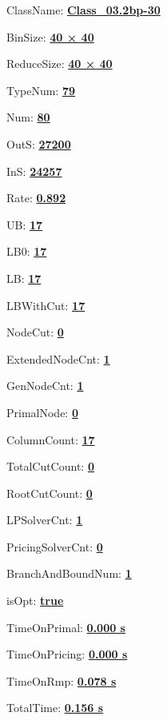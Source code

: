 \documentclass[11pt]{article}
\begin{document}
\pagestyle{empty}


ClassName: \underline{\textbf{Class_03.2bp-30}}
\par
BinSize: \underline{\textbf{40 × 40}}
\par
ReduceSize: \underline{\textbf{40 × 40}}
\par
TypeNum: \underline{\textbf{79}}
\par
Num: \underline{\textbf{80}}
\par
OutS: \underline{\textbf{27200}}
\par
InS: \underline{\textbf{24257}}
\par
Rate: \underline{\textbf{0.892}}
\par
UB: \underline{\textbf{17}}
\par
LB0: \underline{\textbf{17}}
\par
LB: \underline{\textbf{17}}
\par
LBWithCut: \underline{\textbf{17}}
\par
NodeCut: \underline{\textbf{0}}
\par
ExtendedNodeCnt: \underline{\textbf{1}}
\par
GenNodeCnt: \underline{\textbf{1}}
\par
PrimalNode: \underline{\textbf{0}}
\par
ColumnCount: \underline{\textbf{17}}
\par
TotalCutCount: \underline{\textbf{0}}
\par
RootCutCount: \underline{\textbf{0}}
\par
LPSolverCnt: \underline{\textbf{1}}
\par
PricingSolverCnt: \underline{\textbf{0}}
\par
BranchAndBoundNum: \underline{\textbf{1}}
\par
isOpt: \underline{\textbf{true}}
\par
TimeOnPrimal: \underline{\textbf{0.000 s}}
\par
TimeOnPricing: \underline{\textbf{0.000 s}}
\par
TimeOnRmp: \underline{\textbf{0.078 s}}
\par
TotalTime: \underline{\textbf{0.156 s}}
\par
\newpage


\end{document}
